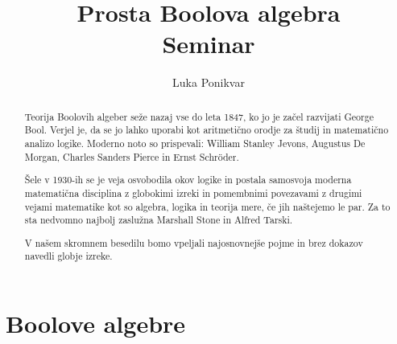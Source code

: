 \documentclass{amsart}
\title[Prosta Boolova algebra]{Prosta Boolova algebra\\\Large Seminar}
\author{Luka Ponikvar}
\begin{document}
\maketitle


\begin{abstract}
    Teorija Boolovih algeber seže nazaj vse do leta 1847, ko jo je začel 
    razvijati George Bool. Verjel je, da se jo lahko uporabi kot aritmetično 
    orodje za študij in matematično analizo logike. Moderno noto so prispevali:
    William Stanley Jevons, Augustus De Morgan, Charles Sanders Pierce in 
    Ernst Schr\"{o}der.

    Šele v 1930-ih se je veja osvobodila okov logike in postala samosvoja moderna 
    matematična disciplina z globokimi izreki in pomembnimi povezavami z drugimi 
    vejami matematike kot so algebra, logika in teorija mere, če jih naštejemo le 
    par. Za to sta nedvomno najbolj zaslužna Marshall Stone in Alfred Tarski.

    V našem skromnem besedilu bomo vpeljali najosnovnejše pojme in brez dokazov 
    navedli globje izreke.
\end{abstract}


\section{Boolove algebre}
\end{document}
